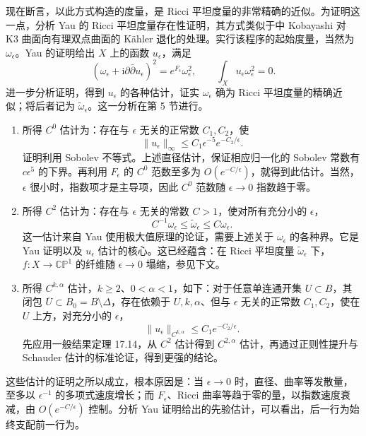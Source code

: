 现在断言，以此方式构造的度量，是 Ricci 平坦度量的非常精确的近似。为证明这一点，分析 Yau 的 Ricci 平坦度量存在性证明，其方式类似于中 Kobayashi 对 K3 曲面向有理双点曲面的 Kähler 退化的处理。实行该程序的起始度量，当然为 $\omega_\epsilon$。Yau 的证明给出 $X$ 上的函数 $u_\epsilon$，满足
\[
(\omega_\epsilon+\mathrm i\partial\bar\partial u_\epsilon)^2
=e^{F_\epsilon}\omega_\epsilon^2,
\qquad\int_Xu_\epsilon\omega_\epsilon^2=0.
\]
进一步分析证明，得到 $u_\epsilon$ 的各种估计，证实 $\omega_\epsilon$ 确为 Ricci 平坦度量的精确近似；将后者记为 $\widetilde\omega_\epsilon$。这一分析在第 5 节进行。

\begin{enumerate}[label=\textup{(\Roman*)}]
\item 所得 $C^0$ 估计为：存在与 $\epsilon$ 无关的正常数 $C_1,C_2$，使
\[
\|u_\epsilon\|_\infty\leq C_1\epsilon^{-5}e^{-C_2/\epsilon}.
\]
证明利用 Sobolev 不等式。上述直径估计，保证相应归一化的 Sobolev 常数有 $c\epsilon^5$ 的下界。再利用 $F_\epsilon$ 的 $C^0$ 范数至多为 $O(e^{-C/\epsilon})$，就得到此估计。当然，$\epsilon$ 很小时，指数项才是主导项，因此 $C^0$ 范数随 $\epsilon\to0$ 指数趋于零。
\item 所得 $C^2$ 估计为：存在与 $\epsilon$ 无关的常数 $C>1$，使对所有充分小的 $\epsilon$，
\[
C^{-1}\omega_\epsilon\leq\widetilde\omega_\epsilon\leq C\omega_\epsilon.
\]
这一估计来自 Yau 使用极大值原理的论证，需要上述关于 $\omega_\epsilon$ 的各种界。它是 Yau 证明以及 $u_\epsilon$ 估计的核心。这已经蕴含：在 Ricci 平坦度量 $\widetilde\omega_\epsilon$ 下，$f\colon X\to\mathbb{CP}^1$ 的纤维随 $\epsilon\to0$ 塌缩，参见下文。
\item 所得 $C^{k,\alpha}$ 估计，$k\geq2$、$0<\alpha<1$，如下：对于任意单连通开集 $U\subset B$，其闭包 $\overline U\subset B_0=B\setminus\Delta$，存在依赖于 $U,k,\alpha$、但与 $\epsilon$ 无关的正常数 $C_1,C_2$，使在 $U$ 上方，对充分小的 $\epsilon$，
\[
\|u_\epsilon\|_{C^{k,\alpha}}\leq C_1e^{-C_2/\epsilon}.
\]
先应用一般结果定理 17.14，从 $C^2$ 估计得到 $C^{2,\alpha}$ 估计，再通过正则性提升与 Schauder 估计的标准论证，得到更强的结论。
\end{enumerate}

这些估计的证明之所以成立，根本原因是：当 $\epsilon\to0$ 时，直径、曲率等发散量，至多以 $\epsilon^{-1}$ 的多项式速度增长；而 $F_\epsilon$、Ricci 曲率等趋于零的量，以指数速度衰减，由 $O(e^{-C/\epsilon})$ 控制。分析 Yau 证明给出的先验估计，可以看出，后一行为始终支配前一行为。

